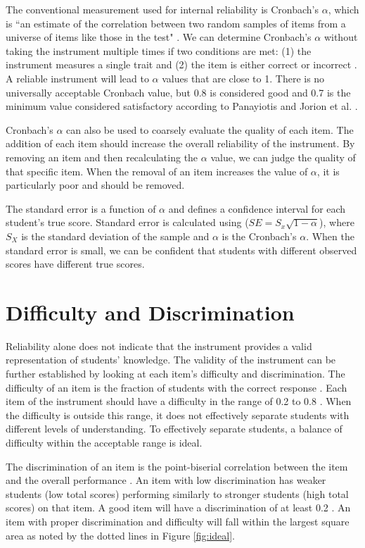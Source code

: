 The conventional measurement used for internal reliability is Cronbach's $\alpha$, which is ``an estimate of the correlation between two random samples of items from a universe of items like those in the test" \cite{og_cronbach}. We can determine Cronbach's $\alpha$  without taking the instrument multiple times if two conditions are met: (1) the instrument measures a single trait and (2) the item is either correct or incorrect \cite{dlci}. A reliable instrument will lead to $\alpha$ values that are close to 1.  There is no universally acceptable Cronbach value, but 0.8 is considered good and 0.7 is the minimum value considered satisfactory according to Panayiotis \cite{panayiotis} and Jorion et al. \cite{jorian}.

Cronbach's $\alpha$ can also be used to coarsely evaluate the quality of each item. The addition of each item should increase the overall reliability of the instrument\cite{dlci}. By removing an item and then recalculating the $\alpha$ value, we can judge the quality of that specific item. When the removal of an item increases the value of $\alpha$, it is particularly poor and should be removed.


The standard error is a function of $\alpha$ and defines a confidence interval for each student's true score. Standard error is calculated using ($SE = S_x \sqrt{1-\alpha}$), where $S_X$ is the standard deviation of the sample and $\alpha$ is the Cronbach's $\alpha$. When the standard error is small, we can be confident that students with different observed scores have different true scores. 


\section{Difficulty and Discrimination}

Reliability alone does not indicate that the instrument provides a valid representation of students' knowledge. The validity of the instrument can be further established by looking at each item's difficulty and discrimination. The difficulty of an item is the fraction of students with the correct response \cite{og_ctt}.  Each item of the instrument should have a difficulty in the range of 0.2 to 0.8 \cite{dlci, jorian}. When the difficulty is outside this range, it does not effectively separate students with different levels of understanding. To effectively separate students, a balance of difficulty within the acceptable range is ideal.

The discrimination of an item is the point-biserial correlation between the item and the overall performance \cite{jorian}. An item with low discrimination has weaker students (low total scores) performing similarly to stronger students (high total scores) on that item. A good item will have a discrimination of at least 0.2 \cite{dlci}. \iflong An item with proper discrimination and difficulty will fall within the largest square area as noted by the dotted lines in Figure \ref{fig:ideal}.\fi 

